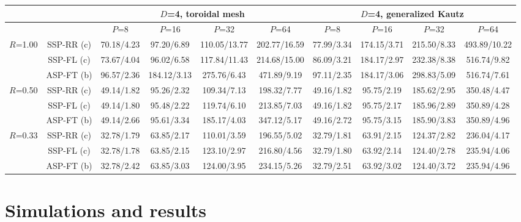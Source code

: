 \documentclass[10pt,twocolumn,journal]{IEEEtran}
\begin{document}
\begin{table*}[t!]
{\begin{tabular}{|c|c|c|c|c|c|c|c|c|c|}
\hline
\hline
& 	 & \multicolumn{4}{c|}{$D$=4, toroidal mesh} & \multicolumn{4}{c|}{$D$=4, generalized Kautz} \\
\hline
& 	 & $P$=8 & $P$=16 & $P$=32 & $P$=64 & $P$=8 & $P$=16 & $P$=32 & $P$=64 \\
\hline
\multirow{3}{*}{$R$=1.00} & SSP-RR (c) & 70.18/4.23 & 97.20/6.89 & 110.05/13.77 & \cellcolor[gray]{0.8} 202.77/16.59 & 77.99/3.34 & 174.15/3.71 & 215.50/8.33 & \cellcolor[gray]{0.8} 493.89/10.22 \\
& SSP-FL (c) & 73.67/4.04 & 96.02/6.58 & 117.84/11.43 & 214.68/15.00 & 86.09/3.21 & 184.17/2.97 & 232.38/8.38 & 516.74/9.82 \\
& ASP-FT (b) & 96.57/2.36 & 184.12/3.13 & 275.76/6.43 & \cellcolor[gray]{0.9} 471.89/9.19 & 97.11/2.35 & 184.17/3.06 & 298.83/5.09 & \cellcolor[gray]{0.9} 516.74/7.61 \\
\hline
\multirow{3}{*}{$R$=0.50} & SSP-RR (c) & 49.14/1.82 & 95.26/2.32 & 109.34/7.13 & 198.32/7.77 & 49.16/1.82 & 95.75/2.19 & 185.62/2.95 & 350.48/4.47 \\
& SSP-FL (c) &  49.14/1.80 & 95.48/2.22 & 119.74/6.10 & 213.85/7.03 & 49.16/1.82 & 95.75/2.17 & 185.96/2.89 & 350.89/4.28 \\
& ASP-FT (b) & 49.14/2.66 & 95.61/3.34 & 185.17/4.03 & 347.12/5.17 & 49.16/2.72 & 95.75/3.15 & 185.90/3.83 & 350.89/4.96 \\
\hline
\multirow{3}{*}{$R$=0.33} & SSP-RR (c) & 32.78/1.79 & 63.85/2.17 & 110.01/3.59 & 196.55/5.02 & 32.79/1.81 & 63.91/2.15 & 124.37/2.82 & 236.04/4.17 \\
& SSP-FL (c) & \cellcolor[gray]{0.7} 32.78/1.78 & 63.85/2.15 & 123.10/2.97 & 216.80/4.56 & \cellcolor[gray]{0.8} 32.79/1.80 & 63.92/2.14 & 124.40/2.78 & 235.94/4.06 \\
& ASP-FT (b) & 32.78/2.42 & 63.85/3.03 & 124.00/3.95 & 234.15/5.26 & 32.79/2.51 & 63.92/3.02 & 124.40/3.72 & 235.94/4.96 \\
\hline
  \end{tabular}
}
\end{table*}

\section{Simulations and results}
\label{sec:results}
\end{document}
